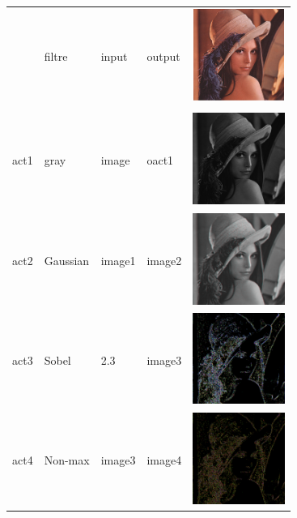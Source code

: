 \begin {table}[!h]
\centering
\begin{tabular} {|p{2cm}|p{2cm}|p{2cm}|p{2cm}||p{3cm}|}

  \hline

 & filtre & input & output &  \includegraphics[width=3cm, height=3cm]{images/lena.png}\\\\

  \hline

 act1 &  gray  & image & oact1& \includegraphics[width=3cm, height=3cm]{images/1.png}\\

   \hline

  act2 & Gaussian & image1 & image2 & \includegraphics[width=3cm, height=3cm]{images/2.png}\\

  \hline

    act3 & Sobel & 2.3 & image3 & \includegraphics[width=3cm, height=3cm]{images/3.png}\\

  \hline

    act4 & Non-max & image3  & image4 &\includegraphics[width=3cm, height=3cm]{images/4.png} \\


\end{tabular}
\end{table}
